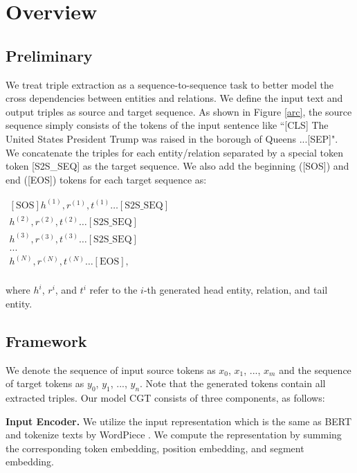 \documentclass[letterpaper]{article} \usepackage{aaai21}  \usepackage{times}  \usepackage{helvet} \usepackage{courier}  \usepackage[hyphens]{url}  \usepackage{graphicx} \urlstyle{rm} \def\UrlFont{\rm}  \usepackage{natbib}  \usepackage[noend]{algpseudocode}
\begin{document}
\section{Overview}

\subsection{Preliminary}
We treat triple extraction as a sequence-to-sequence task to better model the cross dependencies between entities and relations. We define the input text and output triples as source and target sequence. As shown in Figure \ref{arc}, the source sequence simply consists of the tokens of the input sentence like ``[CLS] The United States President Trump was raised in the borough of Queens ...[SEP]". We concatenate the triples for each entity/relation separated by a special token token [S2S\_SEQ] as the target sequence. We also add the beginning ([SOS]) and end ([EOS]) tokens for each target sequence as:
\begin{center}
$  \begin{array}{c}
\mathrm{[SOS]}
h^{(1)}, r^{(1)}, t^{(1)}\ldots[\mathrm{S2S\_SEQ}] \\
h^{(2)}, r^{(2)}, t^{(2)}\ldots[\mathrm{S2S\_SEQ}] \\
h^{(3)}, r^{(3)}, t^{(3)}\ldots[\mathrm{S2S\_SEQ}] \\
...\\
h^{(N)}, r^{(N)}, t^{(N)}\ldots[\mathrm{EOS}], \\
\end{array}$
\end{center}
 
where $h^{i}$, $r^{i}$, and $t^{i}$ refer to the $i$-th generated head entity, relation, and tail entity. 
\subsection{Framework}

We denote the sequence of input source tokens as $x_0$, $x_1$, ..., $x_m$ and the sequence of target tokens as $y_0$, $y_1$, ..., $y_n$. Note that the generated tokens contain all extracted triples. Our model CGT consists of three components, as follows:

\textbf{Input Encoder.} We utilize the input representation which  is the same as BERT \cite{devlin2018bert} and tokenize texts by WordPiece \cite{yonghui2016bridging}. We compute the representation by summing the corresponding token embedding, position embedding, and segment embedding. 
\end{document}

